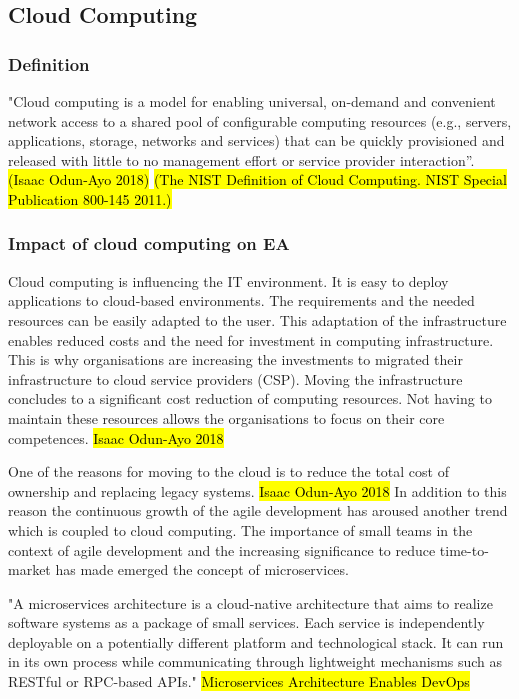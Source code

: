 \subsection{Cloud Computing}

\subsubsection{Definition}
"Cloud computing is a model for enabling universal, on-demand and convenient network access to a shared pool of configurable computing resources (e.g., servers, applications, storage, networks and services) that can be quickly provisioned and released with little to no management effort or service provider interaction”.
\hl{(Isaac Odun-Ayo 2018)}
\hl{(The NIST Definition of Cloud Computing. NIST Special Publication 800-145 2011.)}

\subsubsection{Impact of cloud computing on EA}
Cloud computing is influencing the IT environment. It is easy to deploy applications to cloud-based environments. The requirements and the needed resources can be easily adapted to the user. This adaptation of the infrastructure enables reduced costs and the need for investment in computing infrastructure. This is why organisations are increasing the investments to migrated their infrastructure to cloud service providers (CSP). Moving the infrastructure concludes to a significant cost reduction of computing resources. Not having to maintain these resources allows the organisations to focus on their core competences. \hl{Isaac Odun-Ayo 2018}

One of the reasons for moving to the cloud is to reduce the total cost of ownership and replacing legacy systems. \hl{Isaac Odun-Ayo 2018} In addition to this reason the continuous growth of the agile development has aroused another trend which is coupled to cloud computing. The importance of small teams in the context of agile development and the increasing significance to reduce time-to-market has made emerged the concept of microservices. 

"A microservices architecture is a cloud-native architecture that aims to realize software systems as a package of small services. Each service is independently deployable on a potentially different platform and technological stack. It can run in its own process while communicating through lightweight mechanisms such as RESTful or RPC-based APIs." \hl{Microservices Architecture Enables DevOps}

